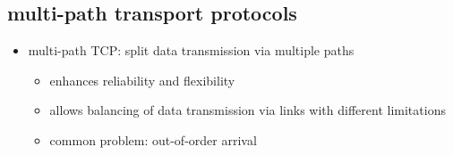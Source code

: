 \documentclass[a4paper,10pt]{scrreprt}
\begin{document}
\begin{itemize}
 \section{multi-path transport protocols}
 \begin{itemize}
  \item multi-path TCP: split data transmission via multiple paths
  \begin{itemize}
   \item enhances reliability and flexibility
   \item allows balancing of data transmission via links with different limitations
   \item common problem: out-of-order arrival
  \end{itemize}
 \end{itemize}
\end{itemize}
\end{document}
